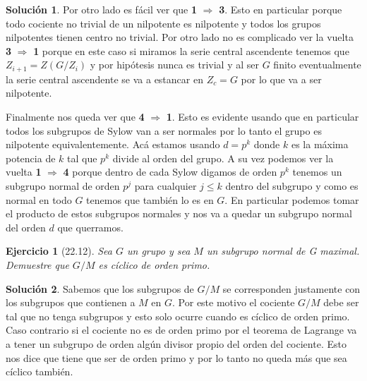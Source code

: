 \documentclass[11pt]{article}
\theoremstyle{plain}
\newtheorem*{ej}{Ejercicio}
\theoremstyle{definition}
\newtheorem*{sol}{Solución}
\theoremstyle{remark}
\begin{document}
\begin{sol}
	Por otro lado es fácil ver que \textbf{1} $\Rightarrow$ \textbf{3}. Esto en particular porque todo cociente no trivial de un nilpotente es nilpotente y todos los grupos nilpotentes tienen centro no trivial. Por otro lado no es complicado ver la vuelta \textbf{3} $\Rightarrow$ \textbf{1} porque en este caso si miramos la serie central ascendente tenemos que $Z_{i+1} = Z(G/Z_i)$ y por hipótesis nunca es trivial y al ser $G$ finito eventualmente la serie central ascendente se va a estancar en $Z_c = G$ por lo que va a ser nilpotente.
	
	Finalmente nos queda ver que \textbf{4} $\Rightarrow$ \textbf{1}. Esto es evidente usando que en particular todos los subgrupos de Sylow van a ser normales por lo tanto el grupo es nilpotente equivalentemente. Acá estamos usando $d=p^{k}$ donde $k$ es la máxima potencia de $k$ tal que $p^{k}$ divide al orden del grupo. A su vez podemos ver la vuelta \textbf{1} $\Rightarrow$ \textbf{4} porque dentro de cada Sylow digamos de orden $p^k$ tenemos un subgrupo normal de orden $p^j$ para cualquier $j\le k$ dentro del subgrupo y como es normal en todo $G$ tenemos que también lo es en $G$. En particular podemos tomar el producto de estos subgrupos normales y nos va a quedar un subgrupo normal del orden $d$ que querramos. 
\end{sol}

\newpage
\begin{tcolorbox}[colback=teal!25!white,colframe=teal!75!black]
	\begin{ej} [22.12] Sea $G$ un grupo y sea $M$ un subgrupo normal de G maximal. Demuestre que $G/M$ es cíclico de orden primo.
	\end{ej}	
\end{tcolorbox}
\medskip

\begin{sol}
	Sabemos que los subgrupos de $G/M$ se corresponden justamente con los subgrupos que contienen a $M$ en $G$. Por este motivo el cociente $G/M$ debe ser tal que no tenga subgrupos y esto solo ocurre cuando es cíclico de orden primo. Caso contrario si el cociente no es de orden primo por el teorema de Lagrange va a tener un subgrupo de orden algún divisor propio del orden del cociente. Esto nos dice que tiene que ser de orden primo y por lo tanto no queda más que sea cíclico también.
\end{sol}
\end{document}
